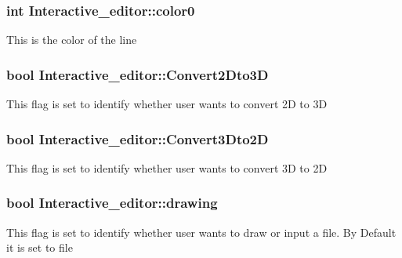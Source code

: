 \subsubsection[{\texorpdfstring{color0}{color0}}]{\setlength{\rightskip}{0pt plus 5cm}int Interactive\+\_\+editor\+::color0}\hypertarget{classInteractive__editor_a0b7d6c7396f1d143791ca39d83b7cf54}{}\label{classInteractive__editor_a0b7d6c7396f1d143791ca39d83b7cf54}
This is the color of the line 
\subsubsection[{\texorpdfstring{Convert2\+Dto3D}{Convert2Dto3D}}]{\setlength{\rightskip}{0pt plus 5cm}bool Interactive\+\_\+editor\+::\+Convert2\+Dto3D}\hypertarget{classInteractive__editor_a13a2206b6c7e86947e85830afb229f36}{}\label{classInteractive__editor_a13a2206b6c7e86947e85830afb229f36}
This flag is set to identify whether user wants to convert 2D to 3D 
\subsubsection[{\texorpdfstring{Convert3\+Dto2D}{Convert3Dto2D}}]{\setlength{\rightskip}{0pt plus 5cm}bool Interactive\+\_\+editor\+::\+Convert3\+Dto2D}\hypertarget{classInteractive__editor_a83829cee0dd00c90dbb841abde5596a4}{}\label{classInteractive__editor_a83829cee0dd00c90dbb841abde5596a4}
This flag is set to identify whether user wants to convert 3D to 2D 
\subsubsection[{\texorpdfstring{drawing}{drawing}}]{\setlength{\rightskip}{0pt plus 5cm}bool Interactive\+\_\+editor\+::drawing}\hypertarget{classInteractive__editor_ace62b483a0866c64212ee0c641445c7a}{}\label{classInteractive__editor_ace62b483a0866c64212ee0c641445c7a}
This flag is set to identify whether user wants to draw or input a file. By Default it is set to file 
